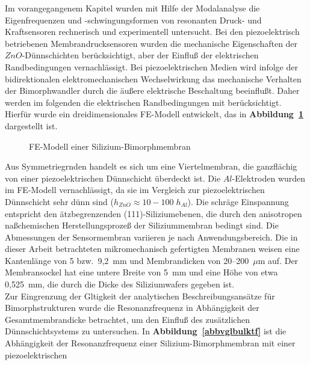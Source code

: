 Im vorangegangenem Kapitel wurden mit Hilfe der Modalanalyse die
Eigenfrequenzen und -schwingungsformen von resonanten Druck- und
Kraftsensoren rechnerisch und experimentell untersucht. Bei den
piezoelektrisch betriebenen Membrandrucksensoren wurden die mechanische
Eigenschaften der $ZnO$-Dünnschichten berücksichtigt, aber der
Einfluß der elektrischen Randbedingungen vernachlässigt. Bei
piezoelektrischen Medien wird infolge der bidirektionalen
elektromechanischen Wechselwirkung das mechanische Verhalten der
Bimorphwandler durch die äußere elektrische Beschaltung beeinflußt.
Daher werden im folgenden die elektrischen Randbedingungen mit
berücksichtigt.\\
Hierfür wurde ein dreidimensionales FE-Modell entwickelt, das
in {\bf Abbildung~\ref{abbbimorph}} dargestellt ist.
\begin{figure}[htb]

\begin{center}

\setabbfein
\end{center}
\caption{\label{abbbimorph}
 FE-Modell einer Silizium-Bimorphmembran}
\end{figure}
Aus Symmetriegrnden
handelt es sich um eine Viertelmembran, die ganzflächig von einer
piezoelektrischen Dünnschicht überdeckt ist. Die $Al$-Elektroden wurden
im FE-Modell vernachlässigt, da sie im Vergleich zur piezoelektrischen
Dünnschicht sehr dünn sind ($h_{ZnO} \approx 10-100 \; h_{Al}$). Die
schräge
Einspannung entspricht den ätzbegrenzenden (111)-Siliziumebenen, die durch
den anisotropen naßchemischen Herstellungsprozeß der Siliziummembran
bedingt sind. Die Abmessungen der
Sensormembran variieren je nach Anwendungsbereich. Die in dieser Arbeit
betrachteten mikromechanisch gefertigten Membranen weisen eine
Kantenlänge von 5 bzw.\ 9,2~mm und Membrandicken von 20--200~$\mu$m auf.
Der Membransockel hat eine untere Breite von 5~mm und eine Höhe von
etwa 0,525~mm, die durch die Dicke des Siliziumwafers
gegeben ist.\\
Zur Eingrenzung der Gltigkeit der analytischen Beschreibungsansätze
für Bimorphstrukturen wurde die Resonanzfrequenz in Abhängigkeit der
Gesamtmembrandicke betrachtet, um den Einfluß des zusätzlichen
Dünnschichtsystems zu untersuchen.
In {\bf Abbildung~\ref{abbvglbulktf}} ist die Abhängigkeit der
Resonanzfrequenz einer Silizium-Bimorphmembran mit einer piezoelektrischen
